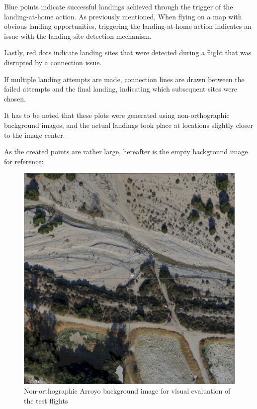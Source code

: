 Blue points indicate successful landings achieved through the trigger of the landing-at-home action. As previously mentioned, When flying on a map with obvious landing opportunities, triggering the landing-at-home action indicates an issue with the landing site detection mechanism.

Lastly, red dots indicate landing sites that were detected during a flight that was disrupted by a connection issue.

If multiple landing attempts are made, connection lines are drawn between the failed attempts and the final landing, indicating which subsequent sites were chosen.

It has to be noted that these plots were generated using non-orthographic background images, and the actual landings took place at locations slightly closer to the image center.

As the created points are rather large, hereafter is the empty background image for reference:

\begin{figure}[h]
\centering
\includegraphics[scale=0.5]{images/evaluation/high_100m_arroyo_grid.png}
\caption{Non-orthographic Arroyo background image for visual evaluation of the test flights}
\label{fig:Arroyo_BG}
\end{figure}


